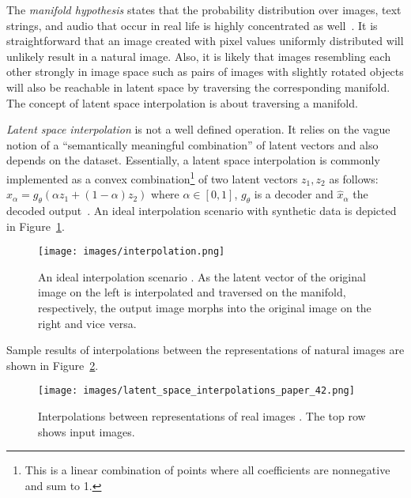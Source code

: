 \documentclass[a4paper,12pt]{report}
\begin{document}
The \textit{manifold hypothesis} states that the probability distribution over images, text strings, and audio that occur in real life is highly concentrated as well~\cite{ReprLearning}. It is straightforward that an image created with pixel values uniformly distributed will unlikely result in a natural image. Also, it is likely that images resembling each other strongly in image space such as pairs of images with slightly rotated objects will also be reachable in latent space by traversing the corresponding manifold. The concept of latent space interpolation is about traversing a manifold.

\textit{Latent space interpolation} is not a well defined operation. It relies on the vague notion of a ``semantically meaningful combination'' of latent vectors and also depends on the dataset. Essentially, a latent space interpolation is commonly implemented as a convex combination\footnote{This is a linear combination of points where all coefficients are nonnegative and sum to 1.} of two latent vectors $z_1, z_2$ as follows: $\hat{x}_{\alpha} = g_{\theta}(\alpha z_1+(1-\alpha)z_2)$ where $\alpha \in [0,1]$, $g_{\theta}$ is a decoder and $\hat{x}_{\alpha}$ the decoded output~\cite{AE_Interp}. An ideal interpolation scenario with synthetic data is depicted in Figure~\ref{fig:interpolation_ideal}.
\begin{figure}[ht]
\centering
\texttt{[image: images/interpolation.png]}
\caption[An ideal interpolation scenario \cite{InkscapeInterpolation}.]{An ideal interpolation scenario \cite{InkscapeInterpolation}. As the latent vector of the original image on the left is interpolated and traversed on the manifold, respectively, the output image morphs into the original image on the right and vice versa.}
\label{fig:interpolation_ideal}
\end{figure}

Sample results of interpolations between the representations of natural images are shown in Figure~\ref{fig:interpolation_real}.
\begin{figure}[ht]
\centering
\texttt{[image: images/latent\_space\_interpolations\_paper\_42.png]}
\caption[Interpolations between representations of real images \cite{InterpolExamples}.]{Interpolations between representations of real images \cite{InterpolExamples}. The top row shows input images.}
\label{fig:interpolation_real}
\end{figure}


\end{document}
